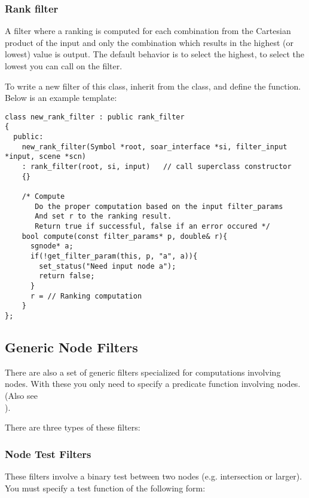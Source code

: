 \subsubsection{Rank filter}

A filter where a ranking is computed for each combination from the Cartesian
product of the input and only the combination which results in the highest 
(or lowest) value is output. The default behavior is to select the highest, 
to select the lowest you can call  on the filter.

To write a new filter of this class, inherit from the  class, 
and define the  function. Below is an example template:

{\footnotesize
\begin{verbatim}
class new_rank_filter : public rank_filter
{
  public:
    new_rank_filter(Symbol *root, soar_interface *si, filter_input *input, scene *scn)
    : rank_filter(root, si, input)   // call superclass constructor
    {}

    /* Compute
       Do the proper computation based on the input filter_params 
       And set r to the ranking result. 
       Return true if successful, false if an error occured */
    bool compute(const filter_params* p, double& r){
      sgnode* a;
      if(!get_filter_param(this, p, "a", a)){
        set_status("Need input node a");
        return false;
      }
      r = // Ranking computation
    }
};
\end{verbatim}
}


\subsection{Generic Node Filters}

There are also a set of generic filters specialized for computations involving nodes. 
With these you only need to specify a predicate function involving nodes. (Also see \\
).

There are three types of these filters:

\subsubsection{Node Test Filters}

These filters involve a binary test between two nodes (e.g. intersection or larger). 
You must specify a test function of the following form:

